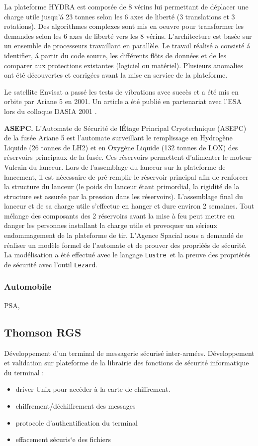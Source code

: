 \documentclass[a4paper,12pt]{article}
\newcommand{\Lustre}{{\tt Lustre}}
\newcommand{\Lezard}{{\tt Lezard}}
\newcommand{\smallspace}{\vspace{0.25cm}}
\begin{document}
La plateforme HYDRA est compos\'ee de 8 v\'erins lui permettant de
d\'eplacer une charge utile jusqu'\'a 23 tonnes selon les 6 axes de
libert\'e (3 translations et 3 rotations). Des algorithmes complexes
sont mis en oeuvre pour transformer les demandes selon les 6 axes de
libert\'e  vers les 8 v\'erins. L'architecture est bas\'ee sur
un ensemble de processeurs travaillant en parall\`ele. Le travail
r\'ealis\'e a consist\'e \'a identifier, \'a partir du code source,
les diff\'erents fl\^ots de donn\'ees et de les comparer aux
protections existantes (logiciel ou mat\'eriel). Plusieurs anomalies
ont \'et\'e d\'ecouvertes et corrig\'ees avant la mise en service de
la plateforme. 

Le satellite Envisat a pass\'e les tests de vibrations avec succ\`es et
a \'et\'e mis en orbite par Ariane 5 en 2001. Un article a \'et\'e
publi\'e en  partenariat avec l'ESA lors du colloque DASIA 2001
\cite{DASIA2001}.


\smallspace
\textbf{ASEPC.} L'Automate de S\'ecurit\'e de l\'Etage Principal
Cryotechnique (ASEPC) de la fus\'ee Ariane 5 est l'automate
surveillant le remplissage en Hydrog\`ene Liquide (26 tonnes de LH2)
et en Oxyg\`ene Liquide (132 tonnes de LOX) des r\'eservoirs
principaux de la fus\'ee. Ces r\'eservoirs permettent d'alimenter le
moteur Vulcain du lanceur.  Lors de l'assemblage du lanceur sur la
plateforme de lancement, il est n\'ecessaire de pr\'e-remplir le
r\'eservoir principal afin de renforcer la structure du lanceur (le
poids du lanceur \'etant primordial, la rigidit\'e de la structure est
assur\'ee par la pression dans les r\'eservoirs). L'assemblage final
du lanceur et de sa charge utile s'effectue en hanger et dure environ
2 semaines.  Tout m\'elange des composants des 2 r\'eservoirs avant la
mise à feu peut mettre en danger les personnes installant la charge
utile et provoquer un s\'erieux endommagement de la plateforme de
tir. L'Agence Spacial nous a demand\'e de r\'ealiser un mod\`ele
formel de l'automate et de prouver des propri\'e\'es de s\'ecurit\'e.
La mod\'elisation a \'et\'e effectu\'e avec le langage \Lustre\ et la
preuve des propri\'et\'es de s\'ecurit\'e avec l'outil \Lezard.

\subsubsection{Automobile}
PSA, 

\subsection{Thomson RGS}
D\'eveloppement d'un terminal de messagerie s\'ecuris\'e
inter-arm\'ees. D\'eveloppement et validation sur plateforme de la
librairie des fonctions de s\'ecurit\'e informatique du terminal :
\begin{itemize}
  \item driver Unix pour acc\'eder \`a la carte de chiffrement.
  \item chiffrement/d\'echiffrement des messages
  \item protocole d'authentification du terminal
  \item effacement s\'ecuris`e des fichiers
\end{itemize}

\newpage



\end{document}
